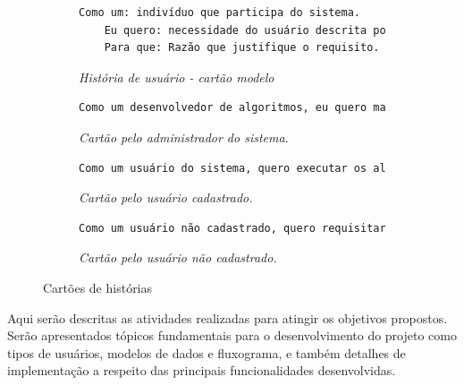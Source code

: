 \documentclass[tg]{mdtufsm}
\begin{document}
\begin{figure}
	\centering
	\begin{subfigure}[c]{1\textwidth}
		\begin{lstlisting}[frame=single, language=Python, numbers=none]
	Como um: indivíduo que participa do sistema.
	Eu quero: necessidade do usuário descrita por ele.
	Para que: Razão que justifique o requisito.
		\end{lstlisting}
		
		\caption{\emph{História de usuário - cartão modelo}}
		\label{fig:userstory}
	\end{subfigure}
	\begin{subfigure}[c]{1\textwidth}
		\begin{lstlisting}[frame=single, language=Python, numbers=none]
	Como um desenvolvedor de algoritmos, eu quero manter uma plataforma para expor meus algoritmos para serem utilizados por outras pessoas.
		\end{lstlisting}
		
		\caption{\emph{Cartão pelo administrador do sistema.}}
		\label{fig:userstory2}
	\end{subfigure}
	\begin{subfigure}[c]{1\textwidth}
		\begin{lstlisting}[frame=single, language=Python, numbers=none]
	Como um usuário do sistema, quero executar os algoritmos oferecidos utilizando meu próprio conjunto de dados para entrada do algoritmos selecionado, e apurar o tempo de execução e o resultado da execução.
		\end{lstlisting}
		
		\caption{\emph{Cartão pelo usuário cadastrado.}}
		\label{fig:userstory3}
	\end{subfigure}
	\begin{subfigure}[c]{1\textwidth}
		\begin{lstlisting}[frame=single, language=Python, numbers=none]
	Como um usuário não cadastrado, quero requisitar acesso ao portal para poder executar meus experimentos.
	\end{lstlisting}
		
		\caption{\emph{Cartão pelo usuário não cadastrado.}}
		\label{fig:userstory4}
	\end{subfigure}
	\caption{Cartões de histórias}
\end{figure}

Aqui serão descritas as atividades realizadas para atingir os objetivos propostos. Serão apresentados tópicos fundamentais para o desenvolvimento do projeto como tipos de usuários, modelos de dados e fluxograma, e também detalhes de implementação a respeito das principais funcionalidades desenvolvidas.
\end{document}
